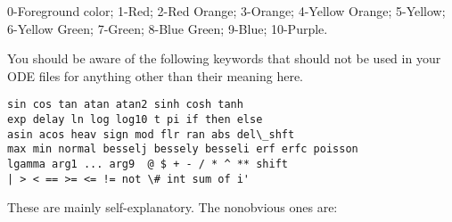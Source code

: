 \bigskip 
{} 0-Foreground color; 1-Red; 2-Red Orange; 3-Orange;
4-Yellow Orange; 5-Yellow; 6-Yellow Green; 7-Green; 8-Blue Green; 9-Blue;
10-Purple.

\bigskip
{}
You should be aware of the following
keywords that should not be used in your ODE files for anything other
than their meaning here.
\begin{verbatim}
sin cos tan atan atan2 sinh cosh tanh
exp delay ln log log10 t pi if then else
asin acos heav sign mod flr ran abs del\_shft 
max min normal besselj bessely besseli erf erfc poisson
lgamma arg1 ... arg9  @ $ + - / * ^ ** shift
| > < == >= <= != not \# int sum of i'
\end{verbatim}




These are mainly self-explanatory. The nonobvious ones are:
